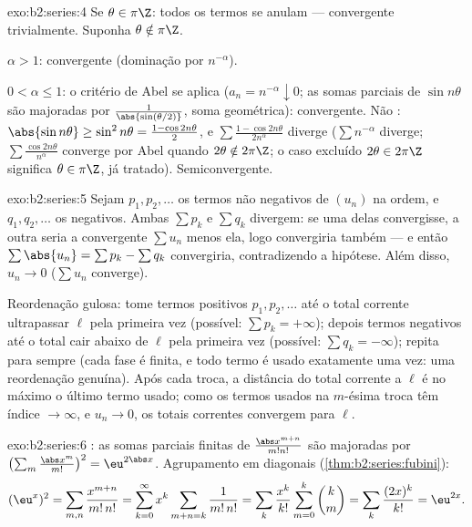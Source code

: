 \begin{solution}{exo:b2:series:4}
Se $\theta \in \pi\Z$: todos os termos se anulam --- convergente trivialmente.
Suponha $\theta \notin \pi\Z$.

$\alpha > 1$:  convergente (dominação por $n^{-\alpha}$).

$0 < \alpha \leq 1$: o critério de Abel se aplica ($a_n = n^{-\alpha}
\downarrow 0$; as somas parciais de $\sin n\theta$ são majoradas por
$\frac{1}{\abs{\sin(\theta/2)}}$, soma geométrica): convergente. Não
: $\abs{\sin n\theta} \geq \sin^2 n\theta = \frac{1 -
\cos 2n\theta}{2}$, e $\sum \frac{1 - \cos 2n\theta}{2n^\alpha}$
diverge ($\sum n^{-\alpha}$ diverge; $\sum
\frac{\cos 2n\theta}{n^\alpha}$ converge por Abel quando $2\theta
\notin 2\pi\Z$; o caso excluído $2\theta \in 2\pi\Z$ significa
$\theta \in \pi\Z$, já tratado). Semiconvergente.
\end{solution}

\begin{solution}{exo:b2:series:5}
Sejam $p_1, p_2, \dots$ os termos não negativos de $(u_n)$ na ordem, e
$q_1, q_2, \dots$ os negativos. Ambas $\sum p_k$ e $\sum
q_k$ divergem: se uma delas convergisse, a outra seria a
convergente $\sum u_n$ menos ela, logo convergiria também --- e então
$\sum \abs{u_n} = \sum p_k - \sum q_k$ convergiria, contradizendo
a hipótese. Além disso, $u_n \to 0$ ($\sum u_n$ converge).

Reordenação gulosa: tome termos positivos $p_1, p_2, \dots$ até
o total corrente ultrapassar $\ell$ pela primeira vez (possível: $\sum p_k =
+\infty$); depois termos negativos até o total cair abaixo de
$\ell$ pela primeira vez (possível: $\sum q_k = -\infty$); repita para sempre (cada
fase é finita, e todo termo é usado exatamente uma vez: uma reordenação
genuína). Após cada troca, a distância do total corrente
a $\ell$ é no máximo o último termo usado; como os termos usados
na $m$-ésima troca têm índice $\to \infty$, e $u_n \to 0$,
os totais correntes convergem para $\ell$.
\end{solution}

\begin{solution}{exo:b2:series:6}
: as somas parciais finitas de
$\frac{\abs x^{m+n}}{m!n!}$ são majoradas por $\bigl(\sum_m
\frac{\abs x^m}{m!}\bigr)^2 = \eu^{2\abs x}$. Agrupamento em diagonais
(\cref{thm:b2:series:fubini}):
\[
(\eu^{x})^2 = \sum_{m,n} \frac{x^{m+n}}{m!\,n!}
= \sum_{k=0}^{\infty} x^k \sum_{m+n=k} \frac{1}{m!\,n!}
= \sum_k \frac{x^k}{k!}\sum_{m=0}^{k}\binom km
= \sum_k \frac{(2x)^k}{k!} = \eu^{2x} .
\]
\end{solution}

